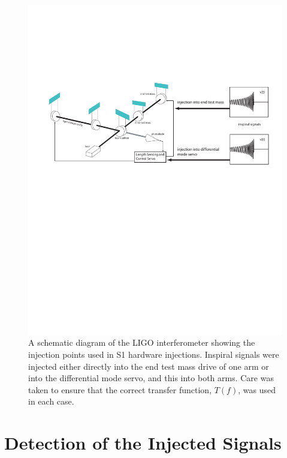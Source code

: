 \begin{figure}[htb]
  \vspace{5pt}
  \begin{flushright}
    \includegraphics[width=\textwidth]{figures/hardware/ifo_inj}    
  \end{flushright}
  \caption{%
  A schematic diagram of the LIGO interferometer showing the injection points
  used in S1 hardware injections. Inspiral signals were injected either
  directly into the end test mass drive of one arm or into the differential
  mode servo, and this into both arms. Care was taken to ensure that the
  correct transfer function, $T(f)$, was used in each case.
  }
\label{f:ifo_inj}
\end{figure}

\section{Detection of the Injected Signals}
\label{s:detection}

